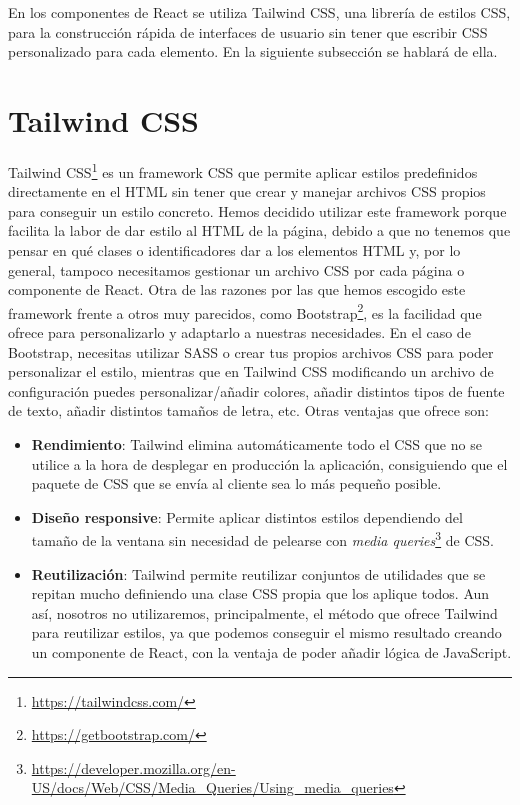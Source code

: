 En los componentes de React se utiliza Tailwind CSS, una librería de estilos CSS, para la construcción rápida de interfaces de usuario sin tener que escribir CSS personalizado para cada elemento. En la siguiente subsección se hablará de ella.



\section{Tailwind CSS}\label{sec:tailwind}
Tailwind CSS\footnote{\url{https://tailwindcss.com/}} es un framework CSS que permite aplicar estilos predefinidos directamente en el HTML sin tener que crear y manejar archivos CSS propios para conseguir un estilo concreto. Hemos decidido utilizar este framework porque facilita la labor de dar estilo al HTML de la página, debido a que no tenemos que pensar en qué clases o identificadores dar a los elementos HTML y, por lo general, tampoco necesitamos gestionar un archivo CSS por cada página o componente de React. Otra de las razones por las que hemos escogido este framework frente a otros muy parecidos, como Bootstrap\footnote{\url{https://getbootstrap.com/}}, es la facilidad que ofrece para personalizarlo y adaptarlo a nuestras necesidades. En el caso de Bootstrap, necesitas utilizar SASS o crear tus propios archivos CSS para poder personalizar el estilo, mientras que en Tailwind CSS modificando un archivo de configuración puedes personalizar/añadir colores, añadir distintos tipos de fuente de texto, añadir distintos tamaños de letra, etc. Otras ventajas que ofrece son:
\begin{itemize}
  \item \textbf{Rendimiento}: Tailwind elimina automáticamente todo el CSS que no se utilice a la hora de desplegar en producción la aplicación, consiguiendo que el paquete de CSS que se envía al cliente sea lo más pequeño posible.
  \item \textbf{Diseño responsive}: Permite aplicar distintos estilos dependiendo del tamaño de la ventana sin necesidad de pelearse con \textit{media queries}\footnote{\url{https://developer.mozilla.org/en-US/docs/Web/CSS/Media_Queries/Using_media_queries}} de CSS.
  \item \textbf{Reutilización}: Tailwind permite reutilizar conjuntos de utilidades que se repitan mucho definiendo una clase CSS propia que los aplique todos. Aun así, nosotros no utilizaremos, principalmente, el método que ofrece Tailwind para reutilizar estilos, ya que podemos conseguir el mismo resultado creando un componente de React, con la ventaja de poder añadir lógica de JavaScript.
\end{itemize}

